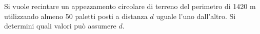 Si vuole recintare un appezzamento circolare di terreno 
del perimetro di 1420 m utilizzando almeno 50 paletti posti a
distanza $d$ uguale l’uno dall’altro. Si determini quali valori può assumere $d$.